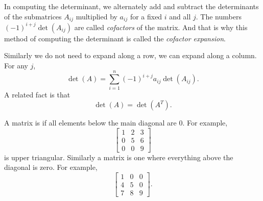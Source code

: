 In computing the determinant,
we alternately add and subtract the determinants of the submatrices
$A_{ij}$ multiplied by $a_{ij}$ for a fixed $i$ and all $j$.
The numbers ${(-1)}^{i+j}\det(A_{ij})$ are called
\emph{cofactors}
of the matrix.  And that is why
this method of computing the determinant is called the
\emph{cofactor expansion}.

Similarly we do not need to expand along a row, we can expand
along a column.  For any $j$,
\begin{equation*}
\det (A)
=
\sum_{i=1}^n
{(-1)}^{i+j}
a_{ij} \det (A_{ij}) .
\end{equation*}
A related fact is that
\begin{equation*}
\det (A) = \det (A^T) .
\end{equation*}

\medskip

A matrix is \emph{} if all elements below
the main diagonal are 0.  For example,
\begin{equation*}
\begin{bmatrix}
1 & 2 & 3 \\
0 & 5 & 6 \\
0 & 0 & 9
\end{bmatrix}
\end{equation*}
is upper triangular.  Similarly a \emph{}
matrix is one where everything above the diagonal is zero.  For example,
\begin{equation*}
\begin{bmatrix}
1 & 0 & 0 \\
4 & 5 & 0 \\
7 & 8 & 9
\end{bmatrix} .
\end{equation*}

